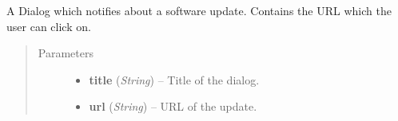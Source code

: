 \documentclass[letterpaper,10pt,english]{sphinxmanual}
\begin{document}

\begin{fulllineitems}
\label{wos:wos.UpdateDialog}
A Dialog which notifies about a software update.
Contains the URL which the user can click on.
\begin{quote}\begin{description}
\item[{Parameters}] \leavevmode\begin{itemize}
\item {} 
\textbf{title} (\emph{String}) -- Title of the dialog.

\item {} 
\textbf{url} (\emph{String}) -- URL of the update.

\end{itemize}

\end{description}\end{quote}

\end{fulllineitems}

\end{document}
